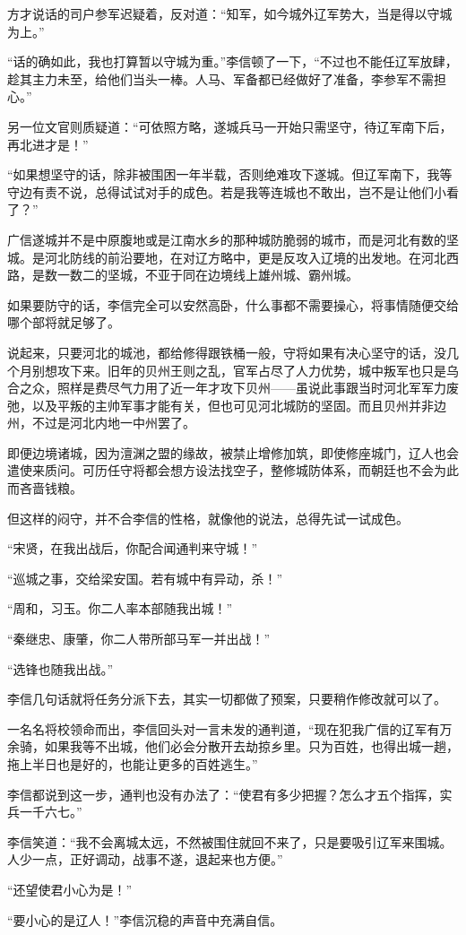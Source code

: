 方才说话的司户参军迟疑着，反对道：“知军，如今城外辽军势大，当是得以守城为上。”

“话的确如此，我也打算暂以守城为重。”李信顿了一下，“不过也不能任辽军放肆，趁其主力未至，给他们当头一棒。人马、军备都已经做好了准备，李参军不需担心。”

另一位文官则质疑道：“可依照方略，遂城兵马一开始只需坚守，待辽军南下后，再北进才是！”

“如果想坚守的话，除非被围困一年半载，否则绝难攻下遂城。但辽军南下，我等守边有责不说，总得试试对手的成色。若是我等连城也不敢出，岂不是让他们小看了？”

广信遂城并不是中原腹地或是江南水乡的那种城防脆弱的城市，而是河北有数的坚城。是河北防线的前沿要地，在对辽方略中，更是反攻入辽境的出发地。在河北西路，是数一数二的坚城，不亚于同在边境线上雄州城、霸州城。

如果要防守的话，李信完全可以安然高卧，什么事都不需要操心，将事情随便交给哪个部将就足够了。

说起来，只要河北的城池，都给修得跟铁桶一般，守将如果有决心坚守的话，没几个月别想攻下来。旧年的贝州王则之乱，官军占尽了人力优势，城中叛军也只是乌合之众，照样是费尽气力用了近一年才攻下贝州——虽说此事跟当时河北军军力废弛，以及平叛的主帅军事才能有关，但也可见河北城防的坚固。而且贝州并非边州，不过是河北内地一中州罢了。

即便边境诸城，因为澶渊之盟的缘故，被禁止增修加筑，即使修座城门，辽人也会遣使来质问。可历任守将都会想方设法找空子，整修城防体系，而朝廷也不会为此而吝啬钱粮。

但这样的闷守，并不合李信的性格，就像他的说法，总得先试一试成色。

“宋贤，在我出战后，你配合闻通判来守城！”

“巡城之事，交给梁安国。若有城中有异动，杀！”

“周和，习玉。你二人率本部随我出城！”

“秦继忠、康肇，你二人带所部马军一并出战！”

“选锋也随我出战。”

李信几句话就将任务分派下去，其实一切都做了预案，只要稍作修改就可以了。

一名名将校领命而出，李信回头对一言未发的通判道，“现在犯我广信的辽军有万余骑，如果我等不出城，他们必会分散开去劫掠乡里。只为百姓，也得出城一趟，拖上半日也是好的，也能让更多的百姓逃生。”

李信都说到这一步，通判也没有办法了：“使君有多少把握？怎么才五个指挥，实兵一千六七。”

李信笑道：“我不会离城太远，不然被围住就回不来了，只是要吸引辽军来围城。人少一点，正好调动，战事不遂，退起来也方便。”

“还望使君小心为是！”

“要小心的是辽人！”李信沉稳的声音中充满自信。

